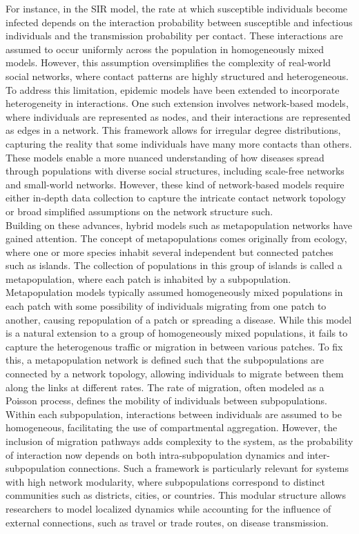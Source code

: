 For instance, in the SIR model, the rate at which susceptible individuals become infected depends on the interaction probability between susceptible and infectious individuals and the transmission probability per contact. These interactions are assumed to occur uniformly across the population in homogeneously mixed models. However, this assumption oversimplifies the complexity of real-world social networks, where contact patterns are highly structured and heterogeneous.\\

To address this limitation, epidemic models have been extended to incorporate heterogeneity in interactions. One such extension involves network-based models, where individuals are represented as nodes, and their interactions are represented as edges in a network. This framework allows for irregular degree distributions, capturing the reality that some individuals have many more contacts than others. These models enable a more nuanced understanding of how diseases spread through populations with diverse social structures, including scale-free networks and small-world networks. However, these kind of network-based models require either in-depth data collection to capture the intricate contact network topology or broad simplified assumptions on the network structure such\cite{shao2022epidemic}.\\

Building on these advances, hybrid models such as metapopulation networks have gained attention. The concept of metapopulations comes originally from ecology, where one or more species inhabit several independent but connected patches such as islands. The collection of populations in this group of islands is called a metapopulation, where each patch is inhabited by a subpopulation. Metapopulation models typically assumed homogeneously mixed populations in each patch with some possibility of individuals migrating from one patch to another, causing repopulation of a patch or spreading a disease\cite{hanski1997metapopulation}. While this model is a natural extension to a group of homogeneously mixed populations, it fails to capture the heterogenous traffic or migration in between various patches. To fix this, a metapopulation network is defined such that the subpopulations are connected by a network topology, allowing individuals to migrate between them along the links at different rates. The rate of migration, often modeled as a Poisson process, defines the mobility of individuals between subpopulations. Within each subpopulation, interactions between individuals are assumed to be homogeneous, facilitating the use of compartmental aggregation. However, the inclusion of migration pathways adds complexity to the system, as the probability of interaction now depends on both intra-subpopulation dynamics and inter-subpopulation connections\cite{watts2005multiscale}. Such a framework is particularly relevant for systems with high network modularity, where subpopulations correspond to distinct communities such as districts, cities, or countries. This modular structure allows researchers to model localized dynamics while accounting for the influence of external connections, such as travel or trade routes, on disease transmission.\\

